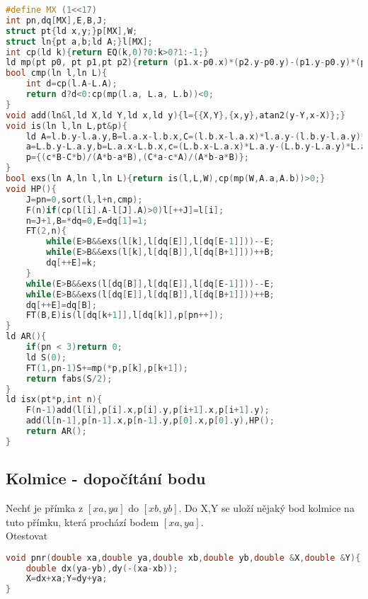 \documentclass[11pt]{article}
\begin{document}
\begin{lstlisting}[language=C++]
#define MX (1<<17)
int pn,dq[MX],E,B,J;
struct pt{ld x,y;}p[MX],W;
struct ln{pt a,b;ld A;}l[MX];
int cp(ld k){return EQ(k,0)?0:k>0?1:-1;}
ld mp(pt p0, pt p1,pt p2){return (p1.x-p0.x)*(p2.y-p0.y)-(p1.y-p0.y)*(p2.x-p0.x);}
bool cmp(ln l,ln L){
    int d=cp(l.A-L.A);
    return d?d<0:cp(mp(l.a, L.a, L.b))<0;
}
void add(ln&l,ld X,ld Y,ld x,ld y){l={{X,Y},{x,y},atan2(y-Y,x-X)};}
void is(ln l,ln L,pt&p){
    ld A=l.b.y-l.a.y,B=l.a.x-l.b.x,C=(l.b.x-l.a.x)*l.a.y-(l.b.y-l.a.y)*l.a.x,
    a=L.b.y-L.a.y,b=L.a.x-L.b.x,c=(L.b.x-L.a.x)*L.a.y-(L.b.y-L.a.y)*L.a.x;
    p={(c*B-C*b)/(A*b-a*B),(C*a-c*A)/(A*b-a*B)};
}
bool exs(ln A,ln l,ln L){return is(l,L,W),cp(mp(W,A.a,A.b))>0;}
void HP(){
    J=pn=0,sort(l,l+n,cmp);
    F(n)if(cp(l[i].A-l[J].A)>0)l[++J]=l[i];
    n=J+1,B=*dq=0,E=dq[1]=1;
    FT(2,n){
        while(E>B&&exs(l[k],l[dq[E]],l[dq[E-1]]))--E;
        while(E>B&&exs(l[k],l[dq[B]],l[dq[B+1]]))++B;
        dq[++E]=k;
    }
    while(E>B&&exs(l[dq[B]],l[dq[E]],l[dq[E-1]]))--E;
    while(E>B&&exs(l[dq[E]],l[dq[B]],l[dq[B+1]]))++B;
    dq[++E]=dq[B];
    FT(B,E)is(l[dq[k+1]],l[dq[k]],p[pn++]);
}
ld AR(){
    if(pn < 3)return 0;
    ld S(0);
    FT(1,pn-1)S+=mp(*p,p[k],p[k+1]);
    return fabs(S/2);
}
ld isx(pt*p,int n){
    F(n-1)add(l[i],p[i].x,p[i].y,p[i+1].x,p[i+1].y);
    add(l[n-1],p[n-1].x,p[n-1].y,p[0].x,p[0].y),HP();
    return AR();
}
\end{lstlisting}
\subsection{Kolmice - dopočítání bodu}
Nechť je přímka z $[xa,ya]$ do $[xb,yb]$. Do \textsf{X},\textsf{Y} se uloží nějaký bod kolmice na tuto přímku, která prochází bodem $[xa,ya]$.
\\Otestovat
\begin{lstlisting}[language=C++]
void pnr(double xa,double ya,double xb,double yb,double &X,double &Y){
    double dx(ya-yb),dy(-(xa-xb));
    X=dx+xa;Y=dy+ya;
}
\end{lstlisting}
\end{document}
